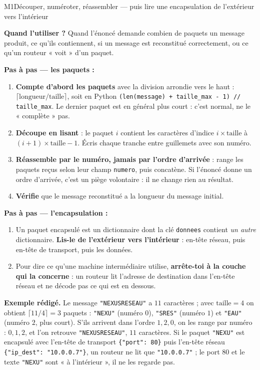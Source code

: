 \begin{fichemethode}{M1}{Découper, numéroter, réassembler --- puis lire une encapsulation de l'extérieur vers l'intérieur}

\textbf{Quand l'utiliser ?} Quand l'énoncé demande combien de paquets un message produit, ce
qu'ils contiennent, si un message est reconstitué correctement, ou ce qu'un routeur « voit »
d'un paquet.

\textbf{Pas à pas --- les paquets :}
\begin{enumerate}
  \item \textbf{Compte d'abord les paquets} avec la division arrondie vers le haut :
        $\lceil \text{longueur} / \text{taille} \rceil$, soit en Python
        \lstinline{(len(message) + taille_max - 1) // taille_max}. Le dernier paquet est en
        général plus court : c'est normal, ne le « complète » pas.
  \item \textbf{Découpe en lisant} : le paquet $i$ contient les caractères d'indice
        $i \times \text{taille}$ à $(i+1) \times \text{taille} - 1$. Écris chaque tranche entre
        guillemets avec son numéro.
  \item \textbf{Réassemble par le numéro, jamais par l'ordre d'arrivée} : range les paquets
        reçus selon leur champ \lstinline{numero}, puis concatène. Si l'énoncé donne un ordre
        d'arrivée, c'est un piège volontaire : il ne change rien au résultat.
  \item \textbf{Vérifie} que le message reconstitué a la longueur du message initial.
\end{enumerate}

\textbf{Pas à pas --- l'encapsulation :}
\begin{enumerate}
  \item Un paquet encapsulé est un dictionnaire dont la clé \lstinline{donnees} contient
        \emph{un autre} dictionnaire. \textbf{Lis-le de l'extérieur vers l'intérieur} : en-tête
        réseau, puis en-tête de transport, puis les données.
  \item Pour dire ce qu'une machine intermédiaire utilise, \textbf{arrête-toi à la couche qui
        la concerne} : un routeur lit l'adresse de destination dans l'en-tête réseau et ne
        décode pas ce qui est en dessous.
\end{enumerate}

\textbf{Exemple rédigé.} Le message \lstinline{"NEXUSRESEAU"} a $11$ caractères ; avec
$\text{taille} = 4$ on obtient $\lceil 11/4 \rceil = 3$ paquets : \lstinline{"NEXU"} (numéro
$0$), \lstinline{"SRES"} (numéro $1$) et \lstinline{"EAU"} (numéro $2$, plus court). S'ils
arrivent dans l'ordre $1, 2, 0$, on les range par numéro : $0, 1, 2$, et l'on retrouve
\lstinline{"NEXUSRESEAU"}, $11$ caractères. Si le paquet \lstinline{"NEXU"} est encapsulé
avec l'en-tête de transport \lstinline|{"port": 80}| puis l'en-tête réseau
\lstinline|{"ip_dest": "10.0.0.7"}|, un routeur ne lit que \lstinline{"10.0.0.7"} ; le port
$80$ et le texte \lstinline{"NEXU"} sont « à l'intérieur », il ne les regarde pas.


\end{fichemethode}
